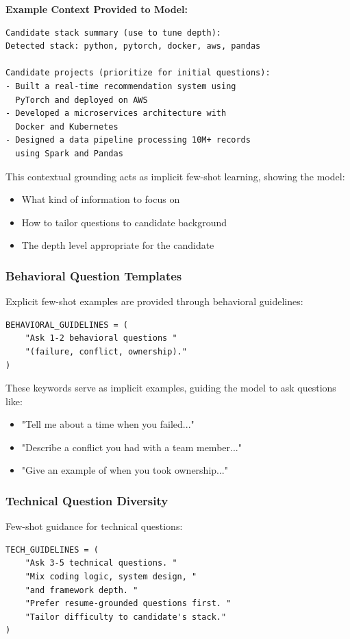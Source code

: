 \documentclass[12pt,a4paper]{article}
\begin{document}
\textbf{Example Context Provided to Model:}
\begin{verbatim}
Candidate stack summary (use to tune depth):
Detected stack: python, pytorch, docker, aws, pandas

Candidate projects (prioritize for initial questions):
- Built a real-time recommendation system using 
  PyTorch and deployed on AWS
- Developed a microservices architecture with 
  Docker and Kubernetes
- Designed a data pipeline processing 10M+ records 
  using Spark and Pandas
\end{verbatim}

This contextual grounding acts as implicit few-shot learning, showing the model:
\begin{itemize}
    \item What kind of information to focus on
    \item How to tailor questions to candidate background
    \item The depth level appropriate for the candidate
\end{itemize}

\subsubsection{Behavioral Question Templates}
Explicit few-shot examples are provided through behavioral guidelines:

\begin{lstlisting}[caption=Behavioral Few-Shot Guidance]
BEHAVIORAL_GUIDELINES = (
    "Ask 1-2 behavioral questions "
    "(failure, conflict, ownership)."
)
\end{lstlisting}

These keywords serve as implicit examples, guiding the model to ask questions like:
\begin{itemize}
    \item "Tell me about a time when you failed..."
    \item "Describe a conflict you had with a team member..."
    \item "Give an example of when you took ownership..."
\end{itemize}

\subsubsection{Technical Question Diversity}
Few-shot guidance for technical questions:

\begin{lstlisting}[caption=Technical Question Guidance]
TECH_GUIDELINES = (
    "Ask 3-5 technical questions. "
    "Mix coding logic, system design, "
    "and framework depth. "
    "Prefer resume-grounded questions first. "
    "Tailor difficulty to candidate's stack."
)
\end{lstlisting}
\end{document}
